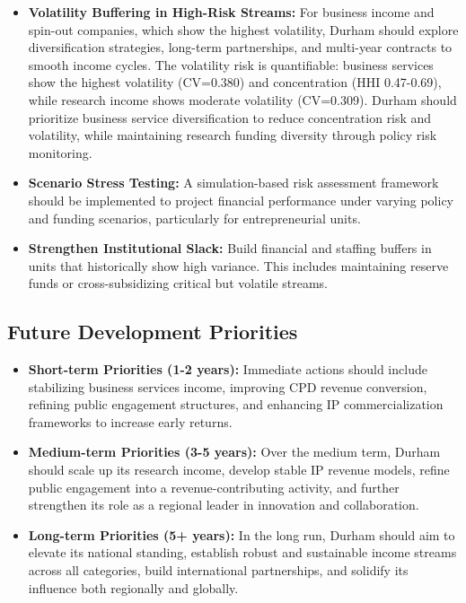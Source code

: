 \documentclass[journal,onecolumn, 10pt,draftclsnofoot]{IEEEtran}
\begin{document}
\begin{itemize}
    \item \textbf{Volatility Buffering in High-Risk Streams:} For business income and spin-out companies, which show the highest volatility, Durham should explore diversification strategies, long-term partnerships, and multi-year contracts to smooth income cycles. The volatility risk is quantifiable: business services show the highest volatility (CV=0.380) and concentration (HHI 0.47-0.69), while research income shows moderate volatility (CV=0.309). Durham should prioritize business service diversification to reduce concentration risk and volatility, while maintaining research funding diversity through policy risk monitoring.
    
    \item \textbf{Scenario Stress Testing:} A simulation-based risk assessment framework should be implemented to project financial performance under varying policy and funding scenarios, particularly for entrepreneurial units.
    
    \item \textbf{Strengthen Institutional Slack:} Build financial and staffing buffers in units that historically show high variance. This includes maintaining reserve funds or cross-subsidizing critical but volatile streams.
\end{itemize}

\subsection{Future Development Priorities}

\begin{itemize}
    \item \textbf{Short-term Priorities (1-2 years):} Immediate actions should include stabilizing business services income, improving CPD revenue conversion, refining public engagement structures, and enhancing IP commercialization frameworks to increase early returns.
    
    \item \textbf{Medium-term Priorities (3-5 years):} Over the medium term, Durham should scale up its research income, develop stable IP revenue models, refine public engagement into a revenue-contributing activity, and further strengthen its role as a regional leader in innovation and collaboration.
    
    \item \textbf{Long-term Priorities (5+ years):} In the long run, Durham should aim to elevate its national standing, establish robust and sustainable income streams across all categories, build international partnerships, and solidify its influence both regionally and globally.
\end{itemize}
\end{document}
